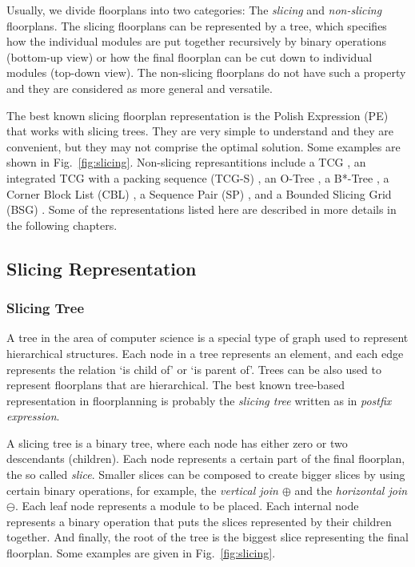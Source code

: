 Usually, we divide floorplans into two categories: The {\em slicing} and {\em non-slicing} floorplans. The slicing floorplans can be represented by a tree, which specifies how the individual modules are put together recursively by binary operations (bottom-up view) or how the final floorplan can be cut down to individual modules (top-down view). The non-slicing floorplans do not have such a property and they are considered as more general and versatile.

The best known slicing floorplan representation is the Polish Expression (PE) \cite{pe} that works with slicing trees. They are very simple to understand and they are convenient, but they may not comprise the optimal solution. Some examples are shown in Fig.~\ref{fig:slicing}. Non-slicing represantitions include a TCG \cite{tcg}, an integrated TCG with a packing sequence (TCG-S) \cite{tcgs}, an O-Tree \cite{otree}, a B*-Tree \cite{btree}, a Corner Block List (CBL) \cite{cbl}, a Sequence Pair (SP) \cite{sp}, and a Bounded Slicing Grid (BSG) \cite{bsg}. Some of the representations listed here are described in more details in the following chapters.

\subsection{Slicing Representation}

\subsubsection{Slicing Tree}

A tree in the area of computer science is a special type of graph used to represent hierarchical structures. Each node in a tree represents an element, and each edge represents the relation `is child of' or `is parent of'. Trees can be also used to represent floorplans that are hierarchical. The best known tree-based representation in floorplanning is probably the {\em slicing tree} written as in {\em postfix expression}.

A slicing tree is a binary tree, where each node has either zero or two descendants (children). Each node represents a certain part of the final floorplan, the so called {\em slice}. Smaller slices can be composed to create bigger slices by using certain binary operations, for example, the {\em vertical join $\oplus$} and the {\em horizontal join $\ominus$}. Each leaf node represents a module to be placed. Each internal node represents a binary operation that puts the slices represented by their children together. And finally, the root of the tree is the biggest slice representing the final floorplan. Some examples are given in Fig.~\ref{fig:slicing}.

